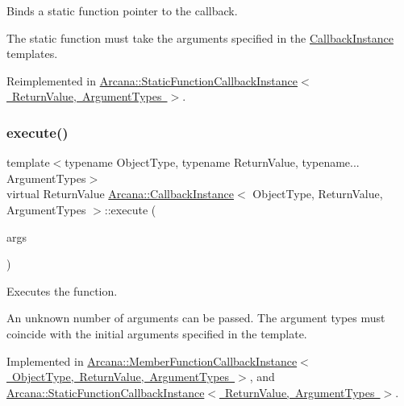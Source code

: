 Binds a static function pointer to the callback. 

The static function must take the arguments specified in the \mbox{\hyperlink{class_arcana_1_1_callback_instance}{Callback\+Instance}} templates. 

Reimplemented in \mbox{\hyperlink{class_arcana_1_1_static_function_callback_instance_aaf3de60d3146a2cb8946976d73a6ab2c}{Arcana\+::\+Static\+Function\+Callback\+Instance$<$ Return\+Value, Argument\+Types $>$}}.

\mbox{\label{class_arcana_1_1_callback_instance_aa5bd9b4ee2129a0c22a98f7fa1cfc724}} 
\subsubsection{\texorpdfstring{execute()}{execute()}}
{\footnotesize\ttfamily template$<$typename Object\+Type, typename Return\+Value, typename... Argument\+Types$>$ \\
virtual Return\+Value \mbox{\hyperlink{class_arcana_1_1_callback_instance}{Arcana\+::\+Callback\+Instance}}$<$ Object\+Type, Return\+Value, Argument\+Types $>$\+::execute (\begin{DoxyParamCaption}\item[{Argument\+Types \&\&...}]{args }\end{DoxyParamCaption})\hspace{0.3cm}{\ttfamily [pure virtual]}}



Executes the function. 

An unknown number of arguments can be passed. The argument types must coincide with the initial arguments specified in the template. 

Implemented in \mbox{\hyperlink{class_arcana_1_1_member_function_callback_instance_aa3da0ee51ae4a6465844c7af67da7d83}{Arcana\+::\+Member\+Function\+Callback\+Instance$<$ Object\+Type, Return\+Value, Argument\+Types $>$}}, and \mbox{\hyperlink{class_arcana_1_1_static_function_callback_instance_a9666f5e80b24e6e38e5d3766a6a577ac}{Arcana\+::\+Static\+Function\+Callback\+Instance$<$ Return\+Value, Argument\+Types $>$}}.

\mbox{\label{class_arcana_1_1_callback_instance_af4aced5d787cabb857931ecd87c3ab50}} 
